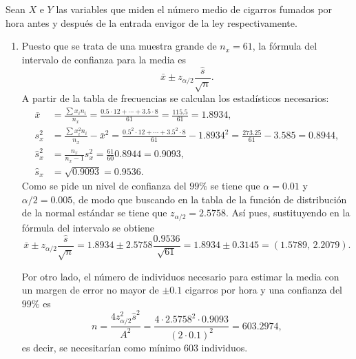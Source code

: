 {Sean $X$ e $Y$ las variables que miden el número medio de cigarros fumados por hora antes y después de la entrada envigor de la ley respectivamente.
\begin{enumerate}  
\item Puesto que se trata de una muestra grande de $n_x=61$, la fórmula del intervalo de confianza para la media es
\[
\bar x \pm z_{\alpha/2}\frac{\hat s}{\sqrt n}.
\]
A partir de la tabla de frecuencias se calculan los estadísticos necesarios:
\begin{align*}
\bar x &= \frac{\sum x_in_i}{n_x} = \frac{0.5\cdot12+\cdots+3.5\cdot8}{61} = \frac{115.5}{61} = 1.8934,\\
s_x^2 & = \frac{\sum x_i^2n_i}{n_x}-\bar x^2 = \frac{0.5^2\cdot12+\cdots+3.5^2\cdot8}{61} -1.8934^2= \frac{273.25}{61}-3.585 = 0.8944,\\
\hat s_x^2 &= \frac{n_x}{n_x-1}s_x^2 = \frac{61}{60}0.8944 = 0.9093,\\
\hat s_x & = \sqrt{0.9093} = 0.9536.
\end{align*}
Como se pide un nivel de confianza del $99\%$ se tiene que $\alpha=0.01$ y $\alpha/2=0.005$, de modo que buscando en la tabla de la función de distribución de la normal estándar se tiene que $z_{\alpha/2} =2.5758$. Así pues, sustituyendo en la fórmula del intervalo se obtiene
\[
\bar x \pm z_{\alpha/2}\frac{\hat s}{\sqrt n} = 1.8934 \pm 2.5758\frac{0.9536}{\sqrt{61}} = 1.8934\pm 0.3145 = (1.5789,\,2.2079).
\]

Por otro lado, el número de individuos necesario para estimar la media con un margen de error no mayor de $\pm 0.1$ cigarros por hora y una confianza del $99\%$ es
\[
n = \frac{4 z_{\alpha/2}^2 \hat s^2}{A^2} = \frac{4\cdot 2.5758^2 \cdot 0.9093}{(2\cdot 0.1)^2} = 603.2974,
\]
es decir, se necesitarían como mínimo $603$ individuos. 


\end{enumerate}}
